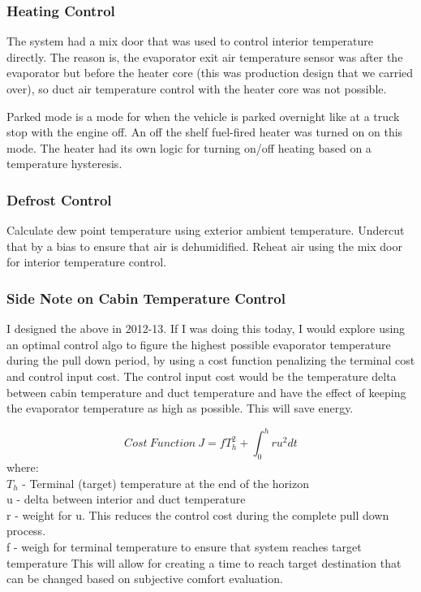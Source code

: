 \subsubsection * {Heating Control}
The system had a mix door that was used to control interior temperature directly. The reason is, the evaporator exit air temperature sensor was after the evaporator but before the heater core (this was production design that we carried over), so duct air temperature control with the heater core was not possible.

Parked mode is a mode for when the vehicle is parked overnight like at a truck stop with the engine off. An off the shelf fuel-fired heater was turned on on this mode. The heater had its own logic for turning on/off heating based on a temperature hysteresis.

\subsubsection * {Defrost Control}
Calculate dew point temperature using exterior ambient temperature. Undercut that by a bias to ensure that air is dehumidified. Reheat air using the mix door for interior temperature control.

\subsubsection * {Side Note on Cabin Temperature Control}
I designed the above in 2012-13. If I was doing this today, I would explore using an optimal control algo to figure the highest possible evaporator temperature during the pull down period, by using a cost function penalizing the terminal cost and control input cost. The control input cost would be the temperature delta between cabin temperature and duct temperature and have the effect of keeping the evaporator temperature as high as possible. This will save energy.

\begin{equation}
Cost \: Function \: J = fT_h^2 + \int_0^h ru^2dt
\end{equation}
where: \\
$T_h$ - Terminal (target) temperature at the end of the horizon \\
u - delta between interior and duct temperature \\
r - weight for u. This reduces the control cost during the complete pull down process. \\
f - weigh for terminal temperature to ensure that system reaches target temperature
\noindent
\newline
\newline
This will allow for creating a time to reach target destination that can be changed based on subjective comfort evaluation.